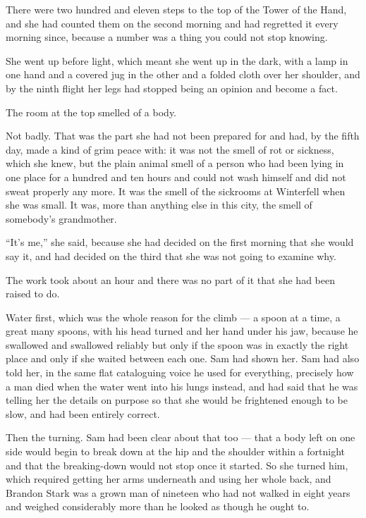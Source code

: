 There were two hundred and eleven steps to the top of the Tower of the Hand, and she had counted them on the second morning and had regretted it every morning since, because a number was a thing you could not stop knowing.

She went up before light, which meant she went up in the dark, with a lamp in one hand and a covered jug in the other and a folded cloth over her shoulder, and by the ninth flight her legs had stopped being an opinion and become a fact.

The room at the top smelled of a body.

Not badly. That was the part she had not been prepared for and had, by the fifth day, made a kind of grim peace with: it was not the smell of rot or sickness, which she knew, but the plain animal smell of a person who had been lying in one place for a hundred and ten hours and could not wash himself and did not sweat properly any more. It was the smell of the sickrooms at Winterfell when she was small. It was, more than anything else in this city, the smell of somebody’s grandmother.

“It’s me,” she said, because she had decided on the first morning that she would say it, and had decided on the third that she was not going to examine why.

The work took about an hour and there was no part of it that she had been raised to do.

Water first, which was the whole reason for the climb — a spoon at a time, a great many spoons, with his head turned and her hand under his jaw, because he swallowed and swallowed reliably but only if the spoon was in exactly the right place and only if she waited between each one. Sam had shown her. Sam had also told her, in the same flat cataloguing voice he used for everything, precisely how a man died when the water went into his lungs instead, and had said that he was telling her the details on purpose so that she would be frightened enough to be slow, and had been entirely correct.

Then the turning. Sam had been clear about that too — that a body left on one side would begin to break down at the hip and the shoulder within a fortnight and that the breaking-down would not stop once it started. So she turned him, which required getting her arms underneath and using her whole back, and Brandon Stark was a grown man of nineteen who had not walked in eight years and weighed considerably more than he looked as though he ought to.

